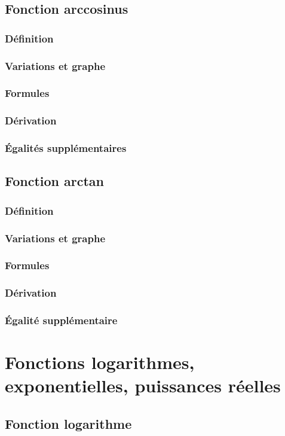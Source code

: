 \documentclass[12pt,a4paper,french]{book}
\begin{document}
	\section{Fonction arccosinus}
		\subsection{Définition}
		\subsection{Variations et graphe}
		\subsection{Formules}
		\subsection{Dérivation}
		\subsection{Égalités supplémentaires}
	\section{Fonction arctan}
		\subsection{Définition}
		\subsection{Variations et graphe}
		\subsection{Formules}
		\subsection{Dérivation}
		\subsection{Égalité supplémentaire}

\chapter{Fonctions logarithmes, exponentielles, puissances réelles}
	\section{Fonction logarithme}
\end{document}
